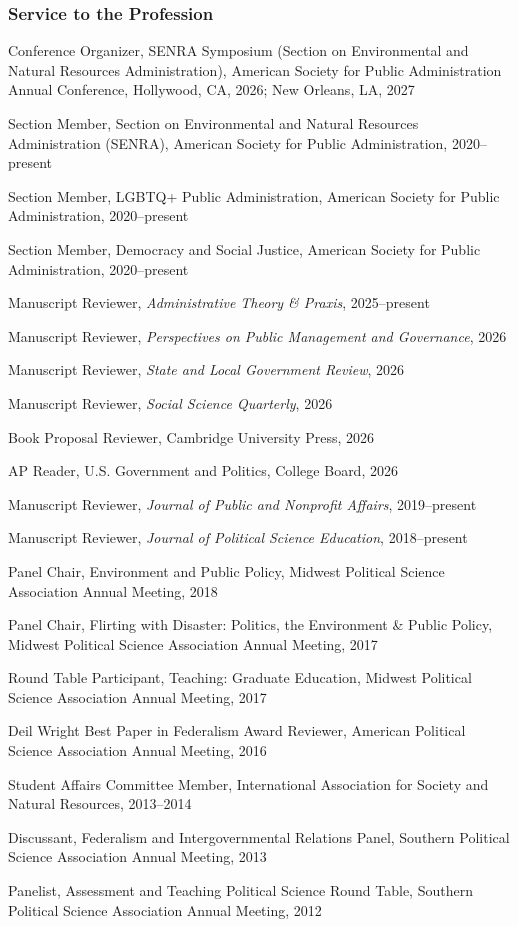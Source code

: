 \documentclass[11pt,letterpaper]{article}
\renewenvironment{itemize}{
  \begin{list}{}{
    \setlength{\leftmargin}{1.5em}
    \setlength{\itemsep}{0.25em}
    \setlength{\parskip}{0pt}
    \setlength{\parsep}{0.25em}
  }
}{
  \end{list}
}
\begin{document}
\subsubsection*{Service to the Profession}
\begin{itemize}\leftmargin=2pt\itemindent=-15pt
    \item Conference Organizer, SENRA Symposium (Section on Environmental and Natural Resources Administration), American Society for Public Administration Annual Conference, Hollywood, CA, 2026; New Orleans, LA, 2027
    \item Section Member, Section on Environmental and Natural Resources Administration (SENRA), American Society for Public Administration, 2020--present
    \item Section Member, LGBTQ+ Public Administration, American Society for Public Administration, 2020--present
    \item Section Member, Democracy and Social Justice, American Society for Public Administration, 2020--present
    \item Manuscript Reviewer, \emph{Administrative Theory \& Praxis}, 2025--present
    \item Manuscript Reviewer, \emph{Perspectives on Public Management and Governance}, 2026
    \item Manuscript Reviewer, \emph{State and Local Government Review}, 2026
    \item Manuscript Reviewer, \emph{Social Science Quarterly}, 2026
    \item Book Proposal Reviewer, Cambridge University Press, 2026
    \item AP Reader, U.S. Government and Politics, College Board, 2026
    \item Manuscript Reviewer, \emph{Journal of Public and Nonprofit Affairs}, 2019--present
    \item Manuscript Reviewer, \emph{Journal of Political Science Education}, 2018--present
    \item Panel Chair, Environment and Public Policy, Midwest Political Science Association Annual Meeting, 2018
    \item Panel Chair, Flirting with Disaster: Politics, the Environment \& Public Policy, Midwest Political Science Association Annual Meeting, 2017
    \item Round Table Participant, Teaching: Graduate Education, Midwest Political Science Association Annual Meeting, 2017
    \item Deil Wright Best Paper in Federalism Award Reviewer, American Political Science Association Annual Meeting, 2016
    \item Student Affairs Committee Member, International Association for Society and Natural Resources, 2013--2014
    \item Discussant, Federalism and Intergovernmental Relations Panel, Southern Political Science Association Annual Meeting, 2013
    \item Panelist, Assessment and Teaching Political Science Round Table, Southern Political Science Association Annual Meeting, 2012
\end{itemize}
\end{document}
